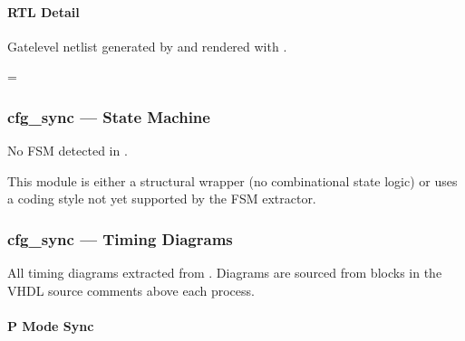 \documentclass[letterpaper,10pt,english]{sphinxmanual}
\begin{document}
\paragraph{RTL Detail}
\label{\detokenize{modules/cfg_sync/block:rtl-detail}}
\sphinxAtStartPar
Gate\sphinxhyphen{}level netlist generated by  and rendered with .

\begin{landscape}
\makeatletter
\spx@image@maxheight=\dimexpr{}\baselineskip\relax
\makeatother


\end{landscape}

\sphinxstepscope


\subsubsection{cfg\_sync — State Machine}
\label{\detokenize{modules/cfg_sync/fsm:cfg-sync-state-machine}}\label{\detokenize{modules/cfg_sync/fsm::doc}}
\sphinxAtStartPar
No FSM detected in .

\sphinxAtStartPar
This module is either a structural wrapper (no combinational
state logic) or uses a coding style not yet supported by the
FSM extractor.

\sphinxstepscope


\subsubsection{cfg\_sync — Timing Diagrams}
\label{\detokenize{modules/cfg_sync/timing:cfg-sync-timing-diagrams}}\label{\detokenize{modules/cfg_sync/timing::doc}}
\sphinxAtStartPar
All timing diagrams extracted from .
Diagrams are sourced from  blocks in the VHDL
source comments above each process.


\paragraph{P Mode Sync}
\label{\detokenize{modules/cfg_sync/timing:p-mode-sync}}
\noindent{}
\end{document}
